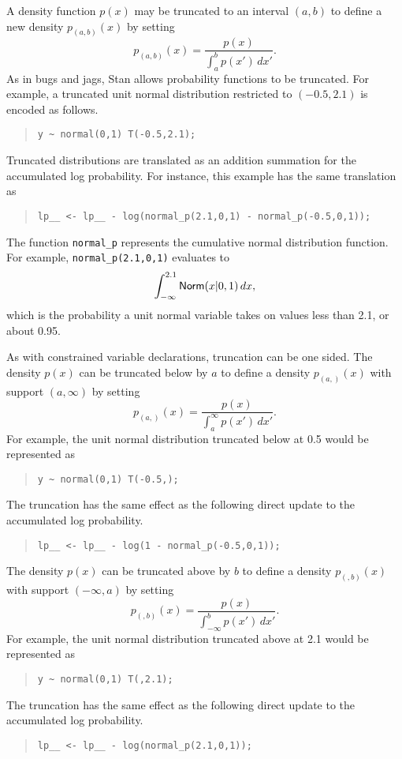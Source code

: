 \documentclass[10pt]{report}
\newcommand{\Stan}{Stan\xspace}
\newcommand{\acronym}[1]{{\sc #1}\xspace}
\newcommand{\BUGS}{\acronym{bugs}}
\newcommand{\JAGS}{\acronym{jags}}
\newcommand{\code}[1]{{\tt #1}}
\begin{document}
A density function $p(x)$ may be truncated to an interval $(a,b)$ to
define a new density $p_{(a,b)}(x)$ by setting
%
\[ 
p_{\!(a,b)\!}(x) = \frac{p(x)}
                  {\int_a^b p(x') \, dx'}.
\] 
As in \BUGS and \JAGS, \Stan allows probability functions to be
truncated.  For example, a truncated unit normal distribution
restricted to $(-0.5,2.1)$ is encoded as follows.
%
\begin{quote}
\begin{Verbatim} 
y ~ normal(0,1) T(-0.5,2.1);
\end{Verbatim}
\end{quote}
% 
Truncated distributions are translated as an addition summation for
the accumulated log probability.  For instance, this example has the
same translation as
%
\begin{quote}
\begin{Verbatim}
lp__ <- lp__ - log(normal_p(2.1,0,1) - normal_p(-0.5,0,1));
\end{Verbatim}
\end{quote}
%
The function \code{normal\_p} represents the cumulative normal
distribution function.  For example, \code{normal\_p(2.1,0,1)} evaluates to 
\[
\int_{-\infty}^{2.1} \mbox{\sf Norm}(x|0,1) \, dx,
\]
%
which is the probability a unit normal variable takes on values less
than 2.1, or about 0.95.

As with constrained variable declarations, truncation can be one
sided.  The density $p(x)$ can be truncated below by $a$ to define a
density $p_{(a,)}(x)$ with support $(a,\infty)$ by setting
%
\[
p_{(a,)}(x) = \frac{p(x)}
                 {\int_a^{\infty} p(x') \, dx'}.
\]
For example, the unit normal distribution truncated below at 0.5 would
be represented as
%
\begin{quote}
\begin{Verbatim} 
y ~ normal(0,1) T(-0.5,);
\end{Verbatim}
\end{quote}
% 
The truncation has the same effect as the following direct update to
the accumulated log probability.
%
\begin{quote}
\begin{Verbatim}
lp__ <- lp__ - log(1 - normal_p(-0.5,0,1));
\end{Verbatim}
\end{quote}

The density $p(x)$ can be truncated above by $b$ to define a density
$p_{(,b)}(x)$ with support $(-\infty,a)$ by setting
\[
p_{(,b)}(x) = \frac{p(x)}
                    {\int_{-\infty}^b p(x') \, dx'}.
\]
For example, the unit normal distribution truncated above at 2.1 would
be represented as
%
\begin{quote}
\begin{Verbatim} 
y ~ normal(0,1) T(,2.1);
\end{Verbatim}
\end{quote}
% 
The truncation has the same effect as the following direct update to
the accumulated log probability.
%
\begin{quote}
\begin{Verbatim}
lp__ <- lp__ - log(normal_p(2.1,0,1));
\end{Verbatim}
\end{quote}
\end{document}
